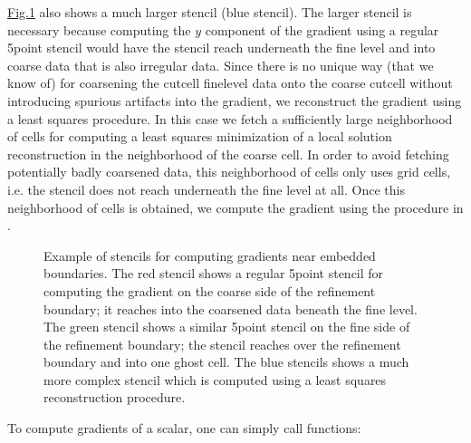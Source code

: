 \documentclass[letterpaper,10pt,english]{sphinxmanual}
\let\sphinxpxdimen\pdfpxdimen\else\newdimen\sphinxpxdimen
\begin{document}
\hyperref[\detokenize{Source/MeshData:fig-ebgradient}]{Fig.\@ \ref{\detokenize{Source/MeshData:fig-ebgradient}}} also shows a much larger stencil (blue stencil).
The larger stencil is necessary because computing the \(y\) component of the gradient using a regular 5\sphinxhyphen{}point stencil would have the stencil reach underneath the fine level and into coarse data that is also irregular data.
Since there is no unique way (that we know of) for coarsening the cut\sphinxhyphen{}cell fine\sphinxhyphen{}level data onto the coarse cut\sphinxhyphen{}cell without introducing spurious artifacts into the gradient, we reconstruct the gradient using a least squares procedure.
In this case we fetch a sufficiently large neighborhood of cells for computing a least squares minimization of a local solution reconstruction in the neighborhood of the coarse cell.
In order to avoid fetching potentially badly coarsened data, this neighborhood of cells only uses  grid cells, i.e. the stencil does not reach underneath the fine level at all.
Once this neighborhood of cells is obtained, we compute the gradient using the procedure in {\hyperref[\detokenize{Utilities/LeastSquares:chap-leastsquares}]{}}.

\begin{figure}[htb]
\centering
\capstart

\noindent\sphinxincludegraphics[width=480\sphinxpxdimen]{{EBGradient}.png}
\caption{Example of stencils for computing gradients near embedded boundaries.
The red stencil shows a regular 5\sphinxhyphen{}point stencil for computing the gradient on the coarse side of the refinement boundary; it reaches into the coarsened data beneath the fine level.
The green stencil shows a similar 5\sphinxhyphen{}point stencil on the fine side of the refinement boundary; the stencil reaches over the refinement boundary and into one ghost cell.
The blue stencils shows a much more complex stencil which is computed using a least squares reconstruction procedure.}\label{\detokenize{Source/MeshData:id4}}\label{\detokenize{Source/MeshData:fig-ebgradient}}\end{figure}

To compute gradients of a scalar, one can simply call  functions:
\end{document}
